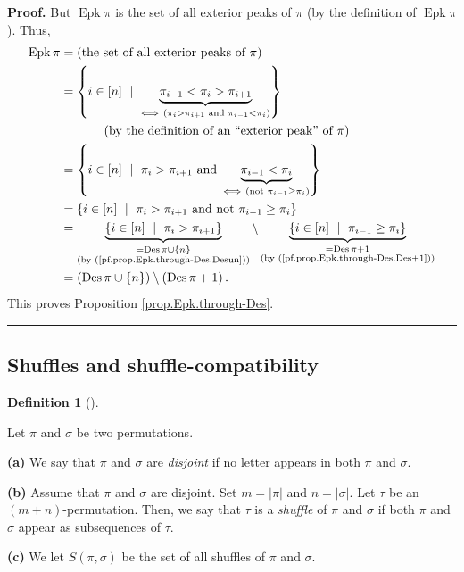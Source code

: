 \documentclass[numbers=enddot,12pt,final,onecolumn,notitlepage]{scrartcl}%
\theoremstyle{definition}
\newtheorem{defi}[theo]{Definition}
\newenvironment{definition}[1][]
{\begin{defi}[#1]\begin{leftbar}}
{\end{leftbar}\end{defi}}
\newenvironment{proof}[1][Proof]{\noindent\textbf{#1.} }{\ \rule{0.5em}{0.5em}}
\begin{document}
\begin{proof}
But $\operatorname*{Epk}\pi$ is the set of all exterior peaks of $\pi$ (by the
definition of $\operatorname*{Epk}\pi$). Thus,%
\begin{align*}
\operatorname*{Epk}\pi &  =\left(  \text{the set of all exterior peaks of }%
\pi\right) \\
&  =\left\{  i\in\left[  n\right]  \ \mid\ \underbrace{\pi_{i-1}<\pi_{i}%
>\pi_{i+1}}_{\Longleftrightarrow\ \left(  \pi_{i}>\pi_{i+1}\text{ and }%
\pi_{i-1}<\pi_{i}\right)  }\right\} \\
&  \ \ \ \ \ \ \ \ \ \ \left(  \text{by the definition of an \textquotedblleft
exterior peak\textquotedblright\ of }\pi\right) \\
&  =\left\{  i\in\left[  n\right]  \ \mid\ \pi_{i}>\pi_{i+1}\text{ and
}\underbrace{\pi_{i-1}<\pi_{i}}_{\Longleftrightarrow\ \left(  \text{not }%
\pi_{i-1}\geq\pi_{i}\right)  }\right\} \\
&  =\left\{  i\in\left[  n\right]  \ \mid\ \pi_{i}>\pi_{i+1}\text{ and not
}\pi_{i-1}\geq\pi_{i}\right\} \\
&  =\underbrace{\left\{  i\in\left[  n\right]  \ \mid\ \pi_{i}>\pi
_{i+1}\right\}  }_{\substack{=\operatorname*{Des}\pi\cup\left\{  n\right\}
\\\text{(by (\ref{pf.prop.Epk.through-Des.Desun}))}}}\setminus
\underbrace{\left\{  i\in\left[  n\right]  \ \mid\ \pi_{i-1}\geq\pi
_{i}\right\}  }_{\substack{=\operatorname*{Des}\pi+1\\\text{(by
(\ref{pf.prop.Epk.through-Des.Des+1}))}}}\\
&  =\left(  \operatorname*{Des}\pi\cup\left\{  n\right\}  \right)
\setminus\left(  \operatorname*{Des}\pi+1\right)  .
\end{align*}
This proves Proposition \ref{prop.Epk.through-Des}.
\end{proof}

\subsection{Shuffles and shuffle-compatibility}

\begin{definition}
\label{def.shuffles}Let $\pi$ and $\sigma$ be two permutations.

\textbf{(a)} We say that $\pi$ and $\sigma$ are \textit{disjoint} if no letter
appears in both $\pi$ and $\sigma$.

\textbf{(b)} Assume that $\pi$ and $\sigma$ are disjoint. Set $m=\left\vert
\pi\right\vert $ and $n=\left\vert \sigma\right\vert $. Let $\tau$ be an
$\left(  m+n\right)  $-permutation. Then, we say that $\tau$ is a
\textit{shuffle} of $\pi$ and $\sigma$ if both $\pi$ and $\sigma$ appear as
subsequences of $\tau$.

\textbf{(c)} We let $S\left(  \pi,\sigma\right)  $ be the set of all shuffles
of $\pi$ and $\sigma$.
\end{definition}
\end{document}
